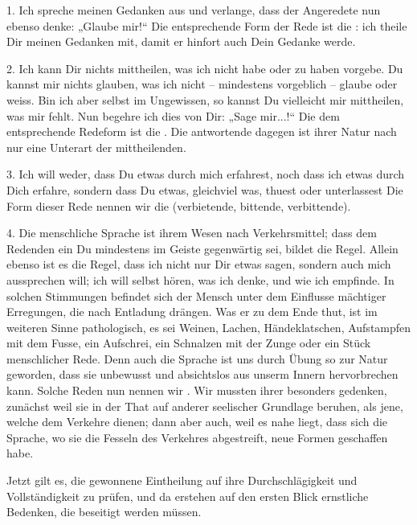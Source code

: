 \label{IV.III.I.1}1. Ich spreche meinen Gedanken aus und verlange, dass der Angeredete nun ebenso denke: „Glaube mir!“ Die entsprechende Form der Rede ist die : ich theile Dir meinen Gedanken mit, damit er hinfort auch Dein Gedanke werde.

\label{IV.III.I.2}2. Ich kann Dir nichts mittheilen, was ich nicht habe oder zu haben vorgebe. Du kannst mir nichts glauben, was ich nicht – mindestens vorgeblich – glaube oder weiss. Bin ich aber selbst im Ungewissen, so kannst Du vielleicht mir mit\-theilen, was mir fehlt. Nun begehre ich dies von Dir: „Sage \label{sp.319} mir...!“ Die dem entsprechende Redeform ist die . Die antwortende dagegen ist ihrer Natur nach nur eine Unterart der mittheilenden.

\label{IV.III.I.3}3. Ich will weder, dass Du etwas durch mich erfahrest, noch dass ich etwas durch Dich erfahre, sondern dass Du etwas, gleichviel was, thuest oder unterlassest Die Form dieser Rede nennen wir die  (verbietende, bittende, verbittende).

\largerpage
{}\label{IV.III.I.4}4. Die menschliche Sprache ist ihrem Wesen nach Verkehrsmittel; dass dem Redenden ein Du mindestens im Geiste gegenwärtig sei, bildet die Regel. Allein ebenso ist es die Regel, dass ich nicht nur Dir etwas sagen, sondern auch mich aussprechen will; ich will selbst hören, was ich denke, und wie ich empfinde. In solchen Stimmungen befindet sich \label{fp.310} der Mensch unter dem Einflusse mächtiger Erregungen, die nach Entladung drängen. Was er zu dem Ende thut, ist im weiteren Sinne pathologisch, es sei Weinen, Lachen, Händeklatschen, Aufstampfen mit dem Fusse, ein Aufschrei, ein Schnalzen mit der Zunge oder ein Stück menschlicher Rede. Denn auch die Sprache ist uns durch Übung so zur Natur geworden, dass sie unbewusst und absichtslos aus unserm Innern hervorbrechen kann. Solche Reden nun nennen wir . Wir mussten ihrer besonders gedenken, zunächst weil sie in der That auf anderer seelischer Grundlage beruhen, als jene, welche dem Verkehre dienen; dann aber auch, weil es nahe liegt, dass sich die Sprache, wo sie die Fesseln des Verkehres abgestreift, neue Formen geschaffen habe.

\label{IV.III.I.5}Jetzt gilt es, die gewonnene Eintheilung auf ihre Durchschlägigkeit und Vollständigkeit zu prüfen, und da erstehen auf den ersten Blick ernstliche Bedenken, die beseitigt werden müssen.

